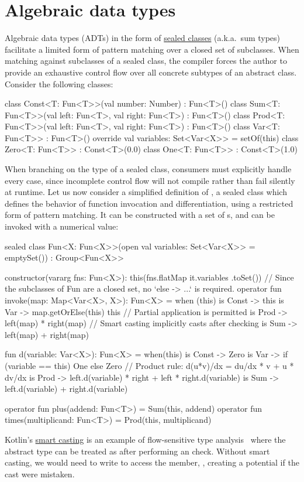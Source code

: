 \section{Algebraic data types}\label{sec:adts}

\noindent Algebraic data types (ADTs) in the form of \href{https://kotlinlang.org/docs/reference/sealed-classes.html}{sealed classes} (a.k.a.\ sum types) facilitate a limited form of pattern matching over a closed set of subclasses. When matching against subclasses of a sealed class, the compiler forces the author to provide an exhaustive control flow over all concrete subtypes of an abstract class. Consider the following classes:
%
\begin{kotlinlisting}
class Const<T: Fun<T>>(val number: Number) : Fun<T>()
class Sum<T: Fun<T>>(val left: Fun<T>, val right: Fun<T>) : Fun<T>()
class Prod<T: Fun<T>>(val left: Fun<T>, val right: Fun<T>) : Fun<T>()
class Var<T: Fun<T>> : Fun<T>() { override val variables: Set<Var<X>> = setOf(this) }
class Zero<T: Fun<T>> : Const<T>(0.0)
class One<T: Fun<T>> : Const<T>(1.0)
\end{kotlinlisting}
%
When branching on the type of a sealed class, consumers must explicitly handle every case, since incomplete control flow will not compile rather than fail silently at runtime. Let us now consider a simplified definition of , a sealed class which defines the behavior of function invocation and differentiation, using a restricted form of pattern matching. It can be constructed with a set of s, and can be invoked with a numerical value:
%
\begin{kotlinlisting}
sealed class Fun<X: Fun<X>>(open val variables: Set<Var<X>> = emptySet()) : Group<Fun<X>> {
    constructor(vararg fns: Fun<X>): this(fns.flatMap { it.variables }.toSet())
    // Since the subclasses of Fun are a closed set, no `else -> ...` is required.
    operator fun invoke(map: Map<Var<X>, X>): Fun<X> = when (this) {
        is Const -> this
        is Var -> map.getOrElse(this) { this } // Partial application is permitted
        is Prod -> left(map) * right(map) // Smart casting implicitly casts after checking
        is Sum -> left(map) + right(map)
    }

    fun d(variable: Var<X>): Fun<X> = when(this) {
        is Const -> Zero
        is Var -> if (variable == this) One else Zero
        // Product rule: d(u*v)/dx = du/dx * v + u * dv/dx
        is Prod -> left.d(variable) * right + left * right.d(variable)
        is Sum -> left.d(variable) + right.d(variable)
    }

    operator fun plus(addend: Fun<T>) = Sum(this, addend)
    operator fun times(multiplicand: Fun<T>) = Prod(this, multiplicand)
}
\end{kotlinlisting}
%
Kotlin's \href{https://kotlinlang.org/docs/reference/typecasts.html#smart-casts}{smart casting} is an example of flow-sensitive type analysis~\citep{pearce2011implementing} where the abstract type  can be treated as  after performing an  check. Without smart casting, we would need to write  to access the member, , creating a potential  if the cast were mistaken.

